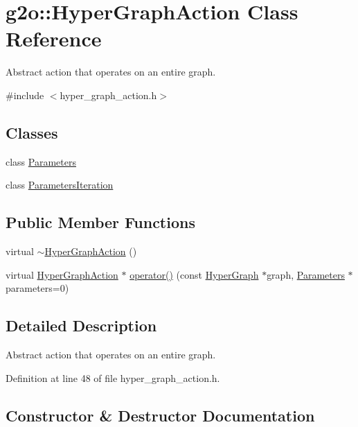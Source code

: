 \hypertarget{classg2o_1_1HyperGraphAction}{}\section{g2o\+:\+:Hyper\+Graph\+Action Class Reference}
\label{classg2o_1_1HyperGraphAction}


Abstract action that operates on an entire graph.  




{\ttfamily \#include $<$hyper\+\_\+graph\+\_\+action.\+h$>$}

\subsection*{Classes}
\begin{DoxyCompactItemize}
\item 
class \hyperlink{classg2o_1_1HyperGraphAction_1_1Parameters}{Parameters}
\item 
class \hyperlink{classg2o_1_1HyperGraphAction_1_1ParametersIteration}{Parameters\+Iteration}
\end{DoxyCompactItemize}
\subsection*{Public Member Functions}
\begin{DoxyCompactItemize}
\item 
virtual \hyperlink{classg2o_1_1HyperGraphAction_a49de9295ace027074f459714ca257b15}{$\sim$\+Hyper\+Graph\+Action} ()
\item 
virtual \hyperlink{classg2o_1_1HyperGraphAction}{Hyper\+Graph\+Action} $\ast$ \hyperlink{classg2o_1_1HyperGraphAction_aea392eafa65ab432a3c4d1dabde9bdbe}{operator()} (const \hyperlink{classg2o_1_1HyperGraph}{Hyper\+Graph} $\ast$graph, \hyperlink{classg2o_1_1HyperGraphAction_1_1Parameters}{Parameters} $\ast$parameters=0)
\end{DoxyCompactItemize}


\subsection{Detailed Description}
Abstract action that operates on an entire graph. 

Definition at line 48 of file hyper\+\_\+graph\+\_\+action.\+h.



\subsection{Constructor \& Destructor Documentation}
